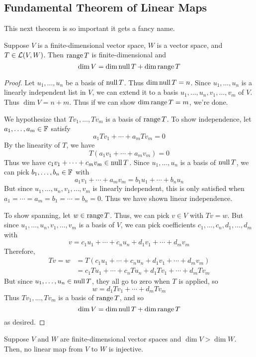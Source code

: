 \subsection*{Fundamental Theorem of Linear Maps}
This next theorem is so important it gets a fancy name.
\begin{theorem}
    Suppose $V$ is a finite-dimensional vector space, $W$ is a vector space, and $T\in \mathcal{L}(V,W)$. Then $\operatorname{range} T$ is finite-dimensional and 
    \[ \dim V = \dim\operatorname{null} T + \dim\operatorname{range} T\]
\end{theorem}
\begin{proof}
    Let $u_1, \dots, u_n$ be a basis of $\operatorname{null} T$. Thus $\dim \operatorname{null} T = n$. Since $u_1, \dots, u_n$ is a linearly independent list in $V$, we can extend it to a basis $u_1, \dots, u_n, v_1, \dots, v_m$ of $V$. Thus $\dim V = n + m$. Thus if we can show $\dim \operatorname{range} T = m$, we're done.

    We hypothesize that $Tv_1, \dots, Tv_m$ is a basis of $\operatorname{range} T$. To show independence, let $a_1, \dots, a_m \in \mathbb F$ satisfy 
    \[ a_1 Tv_1 + \cdots + a_m Tv_m = 0\]
    By the linearity of $T$, we have 
    \[ T(a_1v_1 + \cdots + a_mv_m) = 0\]
    Thus we have $c_1v_1 + \cdots + c_mv_m\in \operatorname{null} T$. Since $u_1, \dots, u_n$ is a basis of $\operatorname{null} T$, we can pick $b_1, \dots, b_n\in \mathbb F$ with
    \[ a_1v_1 + \cdots + a_mv_m = b_1u_1 + \cdots + b_nu_n\]
    But since $u_1, \dots, u_n, v_1, \dots, v_m$ is linearly independent, this is only satisfied when $a_1 = \cdots = a_m = b_1 = \cdots = b_n = 0$. Thus we have shown linear independence.

    To show spanning, let $w\in \operatorname{range} T$. Thus, we can pick $v\in V$ with $Tv = w$. But since $u_1, \dots, u_n, v_1, \dots, v_m$ is a basis of $V$, we can pick coefficients $c_1, \dots, c_n, d_1, \dots, d_m$ with
    \[ v = c_1u_1 + \cdots + c_nu_n + d_1v_1 + \cdots + d_mv_m \]
    Therefore, 
    \begin{align*}
        Tv = w &= T(c_1u_1 + \cdots + c_nu_n + d_1v_1 + \cdots + d_mv_m) \\
        &= c_1Tu_1 + \cdots + c_nTu_n + d_1Tv_1 + \cdots + d_mTv_m
    \end{align*}
    But since $u_1, \dots, u_n \in \operatorname{null} T$, they all go to zero when $T$ is applied, so
    \[ w = d_1Tv_1 + \cdots + d_mTv_m\] 
    Thus $Tv_1, \dots, Tv_m$ is a basis of $\operatorname{range} T$, and so
    \[ \dim V = \dim \operatorname{null} T + \dim \operatorname{range} T\]
    as desired.
\end{proof}
\begin{theorem}
    Suppose $V$ and $W$ are finite-dimensional vector spaces and $\dim V > \dim W$. Then, no linear map from $V$ to $W$ is injective.
\end{theorem}
